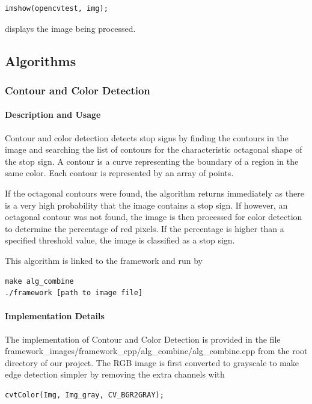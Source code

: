 \documentclass[letterpaper,10pt,titlepage]{article}
\begin{document}
\begin{lstlisting}
imshow(opencvtest, img);
\end{lstlisting}

displays the image being processed.
\subsection*{Algorithms}

\subsubsection*{Contour and Color Detection}
\paragraph*{Description and Usage}
Contour and color detection detects stop signs by finding the contours in the
image and searching the list of contours for the characteristic octagonal 
shape of the stop sign. A contour is a curve representing the boundary of a
region in the same color. Each contour is represented by an array of points.

If the octagonal contours were found, the algorithm returns immediately as 
there is a very high probability that the image contains a stop sign. If 
however, an octagonal contour was not found, the image is then processed for 
color detection to determine the percentage of red pixels. If the percentage is
higher than a specified threshold value, the image is classified as a stop 
sign.

This algorithm is linked to the framework and run by

\begin{lstlisting}
make alg_combine
./framework [path to image file]
\end{lstlisting}

\paragraph*{Implementation Details}
The implementation of Contour and Color Detection is provided in the file 
framework\_images/framework\_cpp/alg\_combine/alg\_combine.cpp from the root 
directory of our project. The RGB image is first converted to grayscale to make
edge detection simpler by removing the extra channels with 

\begin{lstlisting}
cvtColor(Img, Img_gray, CV_BGR2GRAY);
\end{lstlisting}
\end{document}

